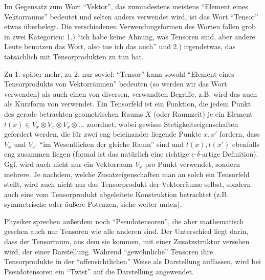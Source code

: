 \begin{remark}
Im Gegensatz zum Wort \enquote{Vektor}, das zumindestens meistens \enquote{Element eines Vektorraums} bedeutet und selten anders verwendet wird, ist das Wort \enquote{Tensor} etwas überbelegt. Die verschiedenen Verwendungsformen des Worten fallen grob in zwei Kategorien: 1.) \enquote{ich habe keine Ahnung, was Tensoren sind, aber andere Leute benutzen das Wort, also tue ich das auch} und 2.) irgendetwas, das tatsächlich mit Tensorprodukten zu tun hat.

\smallbreak
Zu 1. später mehr, zu 2. nur soviel: \enquote{Tensor} kann sowohl \enquote{Element eines Tensorprodukts von Vektorräumen} bedeuten (so werden wir das Wort verwenden) als auch einen von diversen, verwandten Begriffe, z.B. wird das auch als Kurzform von  verwendet. Ein Tensorfeld ist ein Funktion, die jedem Punkt des gerade betrachten geometrischen Raums $X$ (oder Raumzeit) je ein Element $t(x)\in V_x\otimes V_x \otimes V_x \otimes ... $ zuordnet, wobei gewisse Stetigkeitseigenschaften gefordert werden, die für zwei eng beieinander liegende Punkte $x,x'$ fordern, dass $V_x$ und $V_{x'}$ \enquote{im Wesentlichen der gleiche Raum} sind und $t(x),t(x')$ ebenfalls eng zusammen liegen (formal ist das natürlich eine richtige $\epsilon$-$\delta$-artige Definition). Ggf. wird auch nicht nur ein Vektorraum $V_x$ pro Punkt verwendet, sondern mehrere. Je nachdem, welche Zusatzeigenschaften man an solch ein Tensorfeld stellt, wird auch nicht nur das Tensorprodukt der Vektorräume selbst, sondern auch eine vom Tensorprodukt abgeleitete Konstruktion betrachtet (z.B. symmetrische oder äußere Potenzen, siehe weiter unten).

\medbreak
Physiker sprechen außerdem noch \enquote{Pseudotensoren}, die aber mathematisch gesehen auch nur Tensoren wie alle anderen sind. Der Unterschied liegt darin, dass der Tensorraum, aus dem sie kommen, mit einer Zusatzstruktur versehen wird, der einer Darstellung. Während \enquote{gewöhnliche} Tensoren ihre Tensorprodukte in der \enquote{offensichtlichen} Weise als Darstellung auffassen, wird bei Pseudotensoren ein \enquote{Twist} auf die Darstellung angewendet.
\end{remark}

